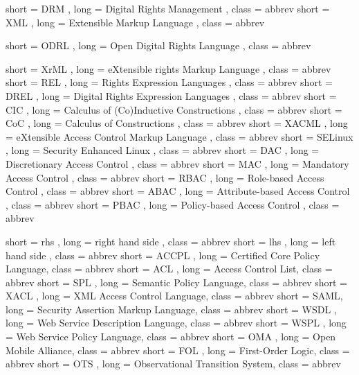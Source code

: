 {
  short = DRM ,
  long  = Digital Rights Management ,
  class = abbrev
}
{
  short = XML ,
  long  = Extensible Markup Language ,
  class = abbrev
}

{
  short = ODRL ,
  long  = Open Digital Rights Language ,
  class = abbrev
}

{
  short = XrML ,
  long  = eXtensible rights Markup Language ,
  class = abbrev
}
{
  short = REL ,
  long  = Rights Expression Languages ,
  class = abbrev
}
{
  short = DREL ,
  long  = Digital Rights Expression Languages ,
  class = abbrev
}
{
  short = CIC ,
  long  = Calculus of (Co)Inductive Constructions ,
  class = abbrev
}
{
  short = CoC ,
  long  = Calculus of Constructions ,
  class = abbrev
}
{
  short = XACML ,
  long  = eXtensible Access Control Markup Language ,
  class = abbrev
}
{
  short = SELinux ,
  long  = Security Enhanced Linux ,
  class = abbrev
}
{
  short = DAC ,
  long  = Discretionary Access Control ,
  class = abbrev
}
{
  short = MAC ,
  long  = Mandatory Access Control ,
  class = abbrev
}
{
  short = RBAC ,
  long  = Role-based Access Control ,
  class = abbrev
}
{
  short = ABAC ,
  long  = Attribute-based Access Control ,
  class = abbrev
}
{
  short = PBAC ,
  long  = Policy-based Access Control ,
  class = abbrev
}

{
  short = rhs ,
  long  = right hand side ,
  class = abbrev
}
{
  short = lhs ,
  long  = left hand side ,
  class = abbrev
}
{
  short = ACCPL ,
  long  =  Certified Core Policy Language,
  class = abbrev
}
{
  short = ACL ,
  long  =  Access Control List,
  class = abbrev
}
{
  short = SPL ,
  long  =  Semantic Policy Language,
  class = abbrev
}
{
  short = XACL ,
  long  =  XML Access Control Language,
  class = abbrev
}
{
  short = SAML,
  long  =  Security Assertion Markup Language,
  class = abbrev
}
{
  short = WSDL ,
  long  =  Web Service Description Language,
  class = abbrev
}
{
  short = WSPL ,
  long  =  Web Service Policy Language,
  class = abbrev
}
{
  short = OMA ,
  long  =  Open Mobile Alliance,
  class = abbrev
}
{
  short = FOL ,
  long  =  First-Order Logic,
  class = abbrev
}
{
  short = OTS ,
  long  =  Observational Transition System,
  class = abbrev
}

